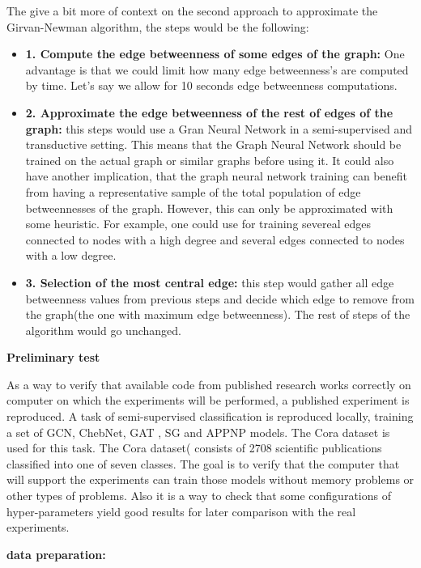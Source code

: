The give a bit more of context on the second approach to approximate the Girvan-Newman algorithm, the steps would be the following:
\begin{itemize}
	\item \textbf{1. Compute the edge betweenness of some edges of the graph:} One advantage is that we could limit how many edge betweenness's are computed by time. Let's say we allow for 10 seconds edge betweenness computations.
	\item \textbf{2. Approximate the edge betweenness of the rest of edges of the graph:} this steps would use a Gran Neural Network in a semi-supervised and transductive setting. This means that the Graph Neural Network should be trained on the actual graph or similar graphs before using it. It could also have another implication, that the graph neural network training can benefit from having a representative sample of the total population of edge betweennesses of the graph. However, this can only be approximated with some heuristic. For example, one could use for training severeal edges connected to nodes with a high degree and several edges connected to nodes with a low degree.
	\item \textbf{3. Selection of the most central edge:} this step would gather all edge betweenness values from previous steps and decide which edge to remove from the graph(the one with maximum edge betweenness). The rest of steps of the algorithm would go unchanged.
\end{itemize}




\textbf{Preliminary test}

As a way to verify that available code from published research works correctly on computer on which the experiments will be performed, a published experiment is reproduced. A task of semi-supervised classification is reproduced locally, training a set of GCN, ChebNet, GAT , SG and APPNP models. The Cora dataset is used for this task.  The Cora dataset(\cite{sen2008collective} consists of 2708 scientific publications classified into one of seven classes. The goal is to verify that the computer that will support the experiments can train those models without memory problems or other types of problems. Also it is a way to check that some configurations of hyper-parameters yield good results for later comparison with the real experiments. 


\textbf{data preparation:}


